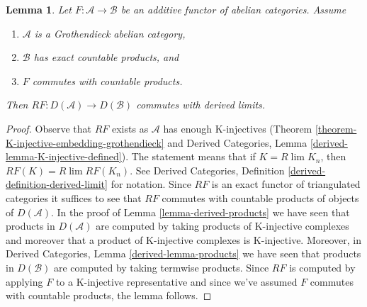 \documentclass[10pt,a4paper]{amsart}
\theoremstyle{plain}
\newtheorem{lemma}[subsection]{Lemma}
\theoremstyle{definition}
\theoremstyle{remark}
\numberwithin{equation}{subsection}
\def\lim{\mathop{\mathrm{lim}}\nolimits}
\begin{document}
\begin{lemma}
\label{lemma-RF-commutes-with-Rlim}
Let $F : \mathcal{A} \to \mathcal{B}$ be an additive functor of
abelian categories. Assume
\begin{enumerate}
\item $\mathcal{A}$ is a Grothendieck abelian category,
\item $\mathcal{B}$ has exact countable products, and
\item $F$ commutes with countable products.
\end{enumerate}
Then
$RF : D(\mathcal{A}) \to D(\mathcal{B})$ commutes with derived limits.
\end{lemma}

\begin{proof}
Observe that $RF$ exists as $\mathcal{A}$ has enough K-injectives
(Theorem \ref{theorem-K-injective-embedding-grothendieck}
and
Derived Categories, Lemma \ref{derived-lemma-K-injective-defined}).
The statement means that if $K = R\lim K_n$, then
$RF(K) = R\lim RF(K_n)$. See
Derived Categories, Definition \ref{derived-definition-derived-limit}
for notation. Since $RF$ is an exact functor of triangulated
categories it suffices to see that $RF$ commutes with countable
products of objects of $D(\mathcal{A})$. In the proof of
Lemma \ref{lemma-derived-products}
we have seen that products in $D(\mathcal{A})$ are computed by
taking products of K-injective complexes and moreover that a
product of K-injective complexes is K-injective.
Moreover, in Derived Categories, Lemma
\ref{derived-lemma-products}
we have seen that products in $D(\mathcal{B})$ are computed
by taking termwise products.
Since $RF$ is computed by applying $F$ to a K-injective
representative and since we've assumed $F$ commutes with
countable products, the lemma follows.
\end{proof}
\end{document}

